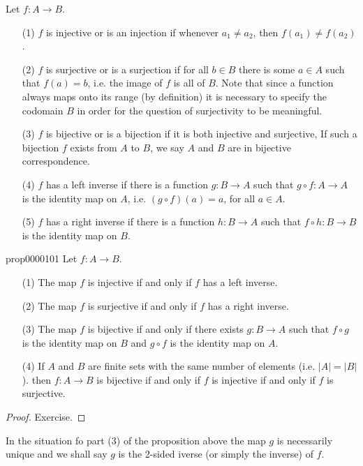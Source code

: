 \documentclass[cn,11pt,chinese]{elegantbook}
\numberwithin{equation}{section}
\begin{document}
Let $f:A \to B$.
\begin{enumerate}
\item[(1)] $f$ is injective or is an injection if whenever $a_1 \neq a_2$, then $f(a_1) \neq f(a_2)$.

\item[(2)] $f$ is surjective or is a surjection if for all $b \in B$ there is some $a \in A$ such that $f(a) = b$, i.e. the image of $f$ is all of $B$. Note that since a function always maps onto its range (by definition) it is necessary to specify the codomain $B$ in order for the question of surjectivity to be meaningful.

\item[(3)] $f$ is bijective or is a bijection if it is both injective and surjective, If such a bijection $f$ exists from $A$ to $B$, we say $A$ and $B$ are in bijective correspondence.

\item[(4)] $f$ has a left inverse if there is a function $g:B \to A$ such that $g \circ f:A \to A$ is the identity map on $A$, i.e. $(g \circ f)(a)=a$, for all $a \in A$.

\item[(5)] $f$ has a right inverse if there is a function $h:B \to A$ such that $f \circ h:B \to B$ is the identity map on $B$.
\end{enumerate}

\begin{proposition}{}{prop0000101}
Let $f:A \to B$.
\begin{enumerate}
\item[(1)] The map $f$ is injective if and only if $f$ has a left inverse.
\item[(2)] The map $f$ is surjective if and only if $f$ has a right inverse.
\item[(3)] The map $f$ is bijective if and only if there exists $g:B \to A$ such that $f \circ g$ is the identity map on $B$ and $g \circ f$ is the identity map on $A$.
\item[(4)] If $A$ and $B$ are finite sets with the same number of elements (i.e. $|A|=|B|$). then $f:A \to B$ is bijective if and only if $f$ is injective if and only if $f$ is surjective.
\end{enumerate}
\end{proposition}

\begin{proof}
Exercise.
\end{proof}

In the situation fo part (3) of the proposition above the map $g$ is necessarily unique and we shall say $g$ is the 2-sided iverse (or simply the inverse) of $f$.
\end{document}
